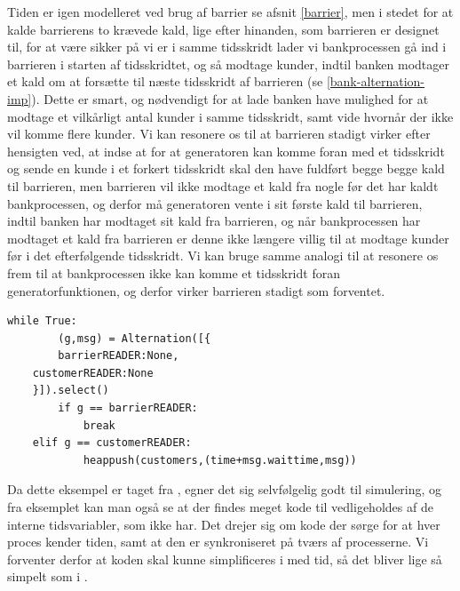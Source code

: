 Tiden er igen modelleret ved brug af barrier se afsnit \cref{barrier}, men 
i stedet for at kalde barrierens to krævede kald, lige efter hinanden, som barrieren er designet til, for at være sikker på vi er i samme tidsskridt lader vi bankprocessen gå ind i barrieren i starten af tidsskridtet, og så modtage kunder, 
indtil banken modtager et kald om at forsætte til næste tidsskridt af 
barrieren (se \cref{bank-alternation-imp}). Dette er smart, og nødvendigt for at lade banken have mulighed for at modtage 
et vilkårligt antal kunder i samme tidsskridt, samt vide hvornår der ikke vil  
komme flere kunder. Vi kan resonere os til at barrieren stadigt virker efter 
hensigten ved, at indse at for at generatoren kan komme foran med et tidsskridt og sende en 
kunde i et forkert tidsskridt skal den have fuldført begge begge kald til barrieren, men 
barrieren vil ikke modtage et kald fra nogle før det har kaldt bankprocessen, 
og derfor må generatoren vente i sit første kald til barrieren, indtil banken har 
modtaget sit kald fra barrieren, og når bankprocessen har modtaget et kald fra barrieren er denne ikke længere villig til at modtage kunder før i det efterfølgende tidsskridt. Vi kan bruge samme analogi til at resonere os frem til at bankprocessen ikke kan komme et tidsskridt foran generatorfunktionen, og derfor virker barrieren stadigt som forventet. 

\begin{lstlisting}[float=hbtp,label=bank-alternation-imp,caption=Modtage en kunde eller 
	barrier i Bankprocessen]
while True:
		(g,msg) = Alternation([{
		barrierREADER:None,
    customerREADER:None
    }]).select()
		if g == barrierREADER:
			break
    elif g == customerREADER:
			heappush(customers,(time+msg.waittime,msg))
\end{lstlisting}

Da dette eksempel er taget fra \simpy, egner det sig selvfølgelig godt til simulering, og fra eksemplet kan man også se at der findes meget kode til vedligeholdes af de interne tidsvariabler, som \simpy ikke har. Det drejer sig om kode der sørge for at hver proces kender tiden, samt at den er synkroniseret på tværs af processerne. Vi forventer derfor at koden skal kunne simplificeres i \pycsp med tid, så det bliver lige så simpelt som i \simpy.

